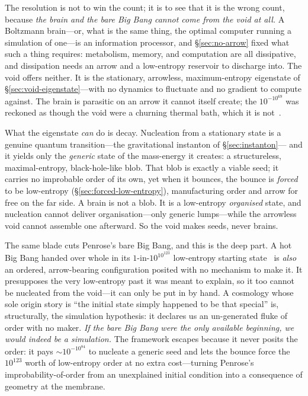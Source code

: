 The resolution is not to win the count; it is to see that it is the wrong count,
because \emph{the brain and the bare Big Bang cannot come from the void at all.} A
Boltzmann brain---or, what is the same thing, the optimal computer running a
simulation of one---is an information processor, and \S\ref{sec:no-arrow} fixed
what such a thing requires: metabolism, memory, and computation are all
dissipative, and dissipation needs an arrow and a low-entropy reservoir to
discharge into. The void offers neither. It is the stationary, arrowless,
maximum-entropy eigenstate of \S\ref{sec:void-eigenstate}---with no dynamics to
fluctuate and no gradient to compute against. The brain is parasitic on an arrow
it cannot itself create; the $10^{-10^{69}}$ was reckoned as though the void were a
churning thermal bath, which it is not~\citep{boddy2014}.

What the eigenstate \emph{can} do is decay. Nucleation from a stationary state is a
genuine quantum transition---the gravitational instanton of \S\ref{sec:instanton}---
and it yields only the \emph{generic} state of the mass-energy it creates: a
structureless, maximal-entropy, black-hole-like blob. That blob is exactly a
viable seed; it carries no improbable order of its own, yet when it bounces, the
bounce is \emph{forced} to be low-entropy (\S\ref{sec:forced-low-entropy}),
manufacturing order and arrow for free on the far side. A brain is not a blob. It
is a low-entropy \emph{organised} state, and nucleation cannot deliver
organisation---only generic lumps---while the arrowless void cannot assemble one
afterward. So the void makes seeds, never brains.

The same blade cuts Penrose's bare Big Bang, and this is the deep part. A hot Big
Bang handed over whole in its $1$-in-$10^{10^{123}}$ low-entropy starting
state~\citep{penrose2010} is \emph{also} an ordered, arrow-bearing configuration
posited with no mechanism to make it. It presupposes the very low-entropy past it
was meant to explain, so it too cannot be nucleated from the void---it can only be
put in by hand. A cosmology whose sole origin story is ``the initial state simply
happened to be that special'' is, structurally, the simulation hypothesis: it
declares us an un-generated fluke of order with no maker. \emph{If the bare Big
Bang were the only available beginning, we would indeed be a simulation.} The
framework escapes because it never posits the order: it pays $\sim10^{-10^{84}}$
to nucleate a generic seed and lets the bounce force the $10^{123}$ worth of
low-entropy order at no extra cost---turning Penrose's improbability-of-order from
an unexplained initial condition into a consequence of geometry at the membrane.


